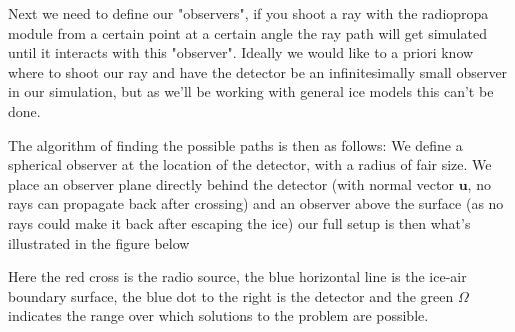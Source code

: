 \documentclass[11pt,a4paper,faculty=we,language=en,doctype=report]{cls/ugent-doc}
\begin{document}
Next we need to define our "observers", if you shoot a ray with the radiopropa
module from a certain point at a certain angle the ray path will get simulated
until it interacts with this "observer".  Ideally we would like to a priori
know where to shoot our ray and have the detector be an infinitesimally small
observer in our simulation, but as we'll be working with general ice models
this can't be done.

The algorithm of finding the possible paths is then as follows: We define a
spherical observer at the location of the detector, with a radius of fair size.
We place an observer plane directly behind the detector (with normal vector
$\mathbf{u}$, no rays can propagate back after crossing) and an observer above
the surface (as no rays could make it back after escaping the ice) our full
setup is then what's illustrated in the figure below

Here the red cross is the radio source, the blue horizontal line is the ice-air
boundary surface, the blue dot to the right is the detector and the green
$\Omega$ indicates the range over which solutions to the problem are possible.
\end{document}
